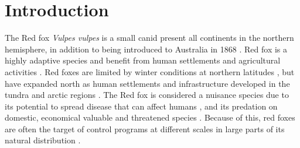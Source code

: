 
\graphicspath{{figures/}}

\lhead{}




\thispagestyle{empty} %


% 

  \linenumbers
  \setlength\linenumbersep{15pt}
  \renewcommand\linenumberfont{\normalfont\footnotesize\sffamily\color{gray}}
  \modulolinenumbers[1] %
  
\newpage

\begin{abstract}
\noindent 
xxxx
yyyy
zzzz
\end{abstract}

\setlength\parindent{.45in} 
\newpage

\doublespacing

\section*{Introduction}

The Red fox \emph{Vulpes vulpes} is a small canid present all continents in the northern hemisphere, in addition to being introduced to Australia in 1868 \citep{lariviereVulpesVulpes1996}. Red fox is a highly adaptive species and benefit from human settlements and agricultural activities \citep{panekRedFoxVulpesVulpes2002,jahrenImpactHumanLand2020,diaz-ruizDriversRedFox2016}. Red foxes are limited by winter conditions at northern latitudes \citep{bartonWinterSeverityLimits2007}, but have expanded north as human settlements and infrastructure developed in the tundra and arctic regions \citep{gallantDisentanglingRelativeInfluences2020}. The Red fox is considered a nuisance species due to its potential to spread disease that can affect humans \citep{andersonPopulationDynamicsFox1981,maasSignificantIncreaseEchinococcus2014}, and its predation on domestic, economical valuable and threatened species \citep{mcleodPotentialParticipatoryLandscape2010,jarnemoREDFOXREMOVAL2005,kammerlePredationPredatorControl2019}. Because of this, red foxes are often the target of control programs at different scales in large parts of its natural distribution \citep{rushtonEffectsCullingFox2006,kammerlePredationPredatorControl2019,loonstraEffectDifferentMammalian2024,heydonDemographyRuralFoxes2000}. 


